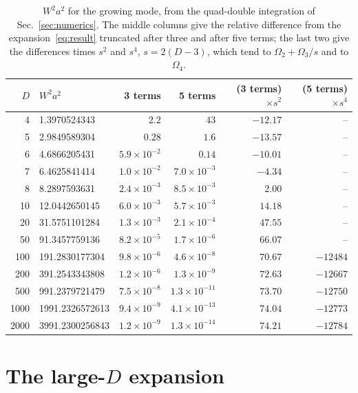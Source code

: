 \documentclass[11pt]{article}
\theoremstyle{remark}
\begin{document}
\begin{table}[t]
\centering
\caption{$W^2a^2$ for the growing mode, from the quad-double integration of Sec.~\ref{sec:numerics}. The middle columns
give the relative difference from the expansion~\eqref{eq:result} truncated after three and after five terms; the last two
give the differences times $s^2$ and $s^4$, $s=2(D-3)$, which tend to $\Omega_2+\Omega_3/s$ and to $\Omega_4$.}
\label{tab:W}
\begin{tabular}{rlrrrr}
\toprule
$D$ & $W^2a^2$ & 3 terms & 5 terms & (3 terms)$\times s^2$ & (5 terms)$\times s^4$ \\
\midrule
4 & 1.3970524343 & $2.2$ & $43$ & $-12.17$ & -- \\
5 & 2.9849589304 & $0.28$ & $1.6$ & $-13.57$ & -- \\
6 & 4.6866205431 & $5.9\times10^{-2}$ & $0.14$ & $-10.01$ & -- \\
7 & 6.4625841414 & $1.0\times10^{-2}$ & $7.0\times10^{-3}$ & $-4.34$ & -- \\
8 & 8.2897593631 & $2.4\times10^{-3}$ & $8.5\times10^{-3}$ & $2.00$ & -- \\
10 & 12.0442650145 & $6.0\times10^{-3}$ & $5.7\times10^{-3}$ & $14.18$ & -- \\
20 & 31.5751101284 & $1.3\times10^{-3}$ & $2.1\times10^{-4}$ & $47.55$ & -- \\
50 & 91.3457759136 & $8.2\times10^{-5}$ & $1.7\times10^{-6}$ & $66.07$ & -- \\
100 & 191.2830177304 & $9.8\times10^{-6}$ & $4.6\times10^{-8}$ & $70.67$ & $-12484$ \\
200 & 391.2543343808 & $1.2\times10^{-6}$ & $1.3\times10^{-9}$ & $72.63$ & $-12667$ \\
500 & 991.2379721479 & $7.5\times10^{-8}$ & $1.3\times10^{-11}$ & $73.70$ & $-12750$ \\
1000 & 1991.2326572613 & $9.4\times10^{-9}$ & $4.1\times10^{-13}$ & $74.04$ & $-12773$ \\
2000 & 3991.2300256843 & $1.2\times10^{-9}$ & $1.3\times10^{-14}$ & $74.21$ & $-12784$ \\
\bottomrule
\end{tabular}
\end{table}

\section{The large-\texorpdfstring{$D$}{D} expansion}\label{sec:largeD}
\end{document}
